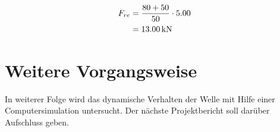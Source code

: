 \documentclass[
a4paper,     %
 headsepline, %
 parskip=half,
 fleqn,       %
12pt         %
]{scrartcl}  %
\begin{document}
\begin{equation}
  \label{eq:10}
  \begin{aligned}
    F_{re} & = \frac{80 + 50}{50} \cdot 5.00 \\
           & = \unit[13.00]{kN}    
  \end{aligned}
\end{equation}

\section{Weitere Vorgangsweise}
\label{sec:weit-vorg}

In weiterer Folge wird das dynamische Verhalten der Welle mit Hilfe einer Computersimulation untersucht. Der nächste Projektbericht soll darüber Aufschluss geben.



 \appendix  %

 

 
\end{document}
